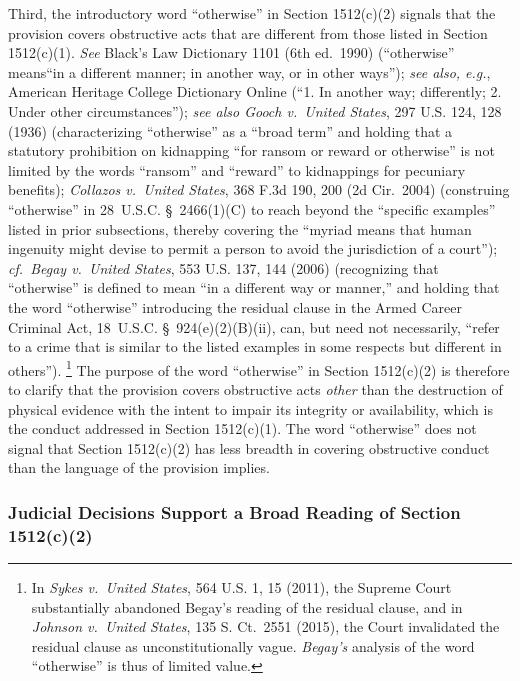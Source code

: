 Third, the introductory word ``otherwise'' in Section 1512(c)(2) signals that the provision covers obstructive acts that are different from those listed in Section 1512(c)(1).
\textit{See} Black's Law Dictionary 1101 (6th ed.~1990) (``otherwise'' means``in a different manner; in another way, or in other ways'');
\textit{see also, e.g.}, American Heritage College Dictionary Online (``1. In another way; differently; 2. Under other circumstances'');
\textit{see also Gooch v.\ United States}, 297 U.S. 124, 128 (1936) (characterizing ``otherwise'' as a ``broad term'' and holding that a statutory prohibition on kidnapping ``for ransom or reward or otherwise'' is not limited by the words ``ransom'' and ``reward'' to kidnappings for pecuniary benefits);
\textit{Collazos v.\ United States}, 368 F.3d 190, 200 (2d Cir.~2004) (construing ``otherwise'' in 28~U.S.C. \S~2466(1)(C) to reach beyond the ``specific examples'' listed in prior subsections, thereby covering the ``myriad means that human ingenuity might devise to permit a person to avoid the jurisdiction of a court'');
\textit{cf.~Begay v.\ United States}, 553 U.S. 137, 144 (2006) (recognizing that ``otherwise'' is defined to mean ``in a different way or manner,'' and holding that the word ``otherwise'' introducing the residual clause in the Armed Career Criminal Act, 18~U.S.C. \S~924(e)(2)(B)(ii), can, but need not necessarily, ``refer to a crime that is similar to the listed examples in some respects but different in others'').%
\footnote{In \textit{Sykes v.\ United States}, 564 U.S. 1, 15 (2011), the Supreme Court substantially abandoned Begay's reading of the residual clause, and in \textit{Johnson v.\ United States}, 135 S. Ct.~2551 (2015), the Court invalidated the residual clause as unconstitutionally vague.
\textit{Begay's} analysis of the word ``otherwise'' is thus of limited value.}
The purpose of the word ``otherwise'' in Section 1512(c)(2) is therefore to clarify that the provision covers obstructive acts \textit{other} than the destruction of physical evidence with the intent to impair its integrity or availability, which is the conduct addressed in Section 1512(c)(1).
The word ``otherwise'' does not signal that Section 1512(c)(2) has less breadth in covering obstructive conduct than the language of the provision implies.

\subsubsection{Judicial Decisions Support a Broad Reading of Section 1512(c)(2)}

